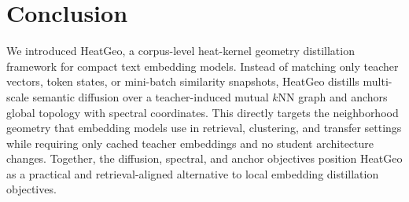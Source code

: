 \section{Conclusion}

We introduced HeatGeo, a corpus-level heat-kernel geometry distillation framework for compact text embedding models. Instead of matching only teacher vectors, token states, or mini-batch similarity snapshots, HeatGeo distills multi-scale semantic diffusion over a teacher-induced mutual $k$NN graph and anchors global topology with spectral coordinates. This directly targets the neighborhood geometry that embedding models use in retrieval, clustering, and transfer settings while requiring only cached teacher embeddings and no student architecture changes. Together, the diffusion, spectral, and anchor objectives position HeatGeo as a practical and retrieval-aligned alternative to local embedding distillation objectives.
